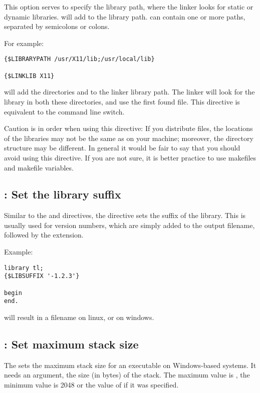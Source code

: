 This option serves to specify the library path, where the linker looks for
static or dynamic libraries.  will add 
to the library path.  can contain one or more paths, separated
by semicolons or colons.

For example:
\begin{verbatim}
{$LIBRARYPATH /usr/X11/lib;/usr/local/lib}

{$LINKLIB X11}
\end{verbatim}

will add the directories  and  to
the linker library path. The linker will look for the library 
in both these directories, and use the first found file. This directive is
equivalent to the  command line switch.

Caution is in order when using this directive: If you distribute files, the
locations of the libraries may not be the same as on your machine; moreover, the
directory structure may be different. In general it would be fair to say
that you should avoid using this directive. If you are not sure, it is better
practice to use makefiles and makefile variables.

\subsection{ : Set the library suffix}
Similar to the  and  directives, the
 directive sets the suffix of the library. 
This is usually used for version numbers, which are simply added to the 
output filename, followed by the extension.

Example:
\begin{verbatim}
library tl;
{$LIBSUFFIX '-1.2.3'}

begin
end.
\end{verbatim}
will result in a filename  on linux, or
 on windows.

\subsection{ : Set maximum stack size}
The  sets the maximum stack size for an executable
on Windows-based systems. It needs an argument, the size (in bytes) of the
stack. The maximum value is , the minimum value is 2048 or the
value of  if it was specified.

